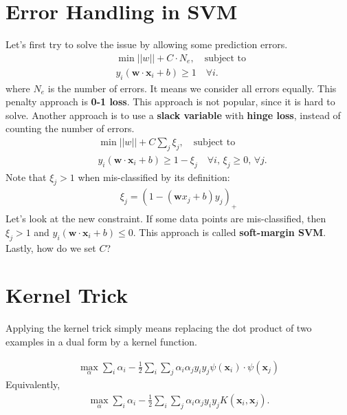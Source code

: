\section{Error Handling in SVM}
Let's first try to solve the issue by allowing some prediction errors. 
\begin{align*}
	&\min ||w||+C\cdot N_{e},\quad \textrm{subject to } \\
	&y_i(\mathbf{w}\cdot \mathbf{x}_i+b)\geq 1 \quad \forall i.
\end{align*}
where $N_e$ is the number of errors. It means we consider all errors equally. This penalty approach is \textbf{0-1 loss}. This approach is not popular, since it is hard to solve. Another approach is to use a \textbf{slack variable} with \textbf{hinge loss}, instead of counting the number of errors. 
\begin{align*}
	&\min ||w||+C\sum_j\xi_j ,\quad \textrm{subject to } \\
	&y_i(\mathbf{w}\cdot \mathbf{x}_i+b)\geq 1-\xi_j \quad \forall i,\, \xi_j\geq 0,\, \forall j.
\end{align*}
Note that $\xi_j>1$ when mis-classified by its definition: 
\begin{align*}
	\xi_j = (1-(\mathbf{w}x_j+b)y_j)_+
\end{align*}
Let's look at the new constraint. If some data points are mis-classified, then $\xi_j>1$ and $y_i(\mathbf{w}\cdot \mathbf{x}_i+b)\leq 0$. This approach is called \textbf{soft-margin SVM}. Lastly, how do we set $C$?

\section{Kernel Trick}
\label{sec:kernel_trick}
Applying the kernel trick simply means replacing the dot product of two examples in a dual form by a kernel function. 

\begin{align}
	 \max_\alpha \sum_i \alpha_i -\frac{1}{2}\sum_i\sum_j \alpha_i\alpha_j y_iy_j \psi(\mathbf{x}_i)\cdot \psi(\mathbf{x}_j)
	 \label{eq:kernel_dual_form}
\end{align}
Equivalently, 
\begin{align}
	 \max_\alpha \sum_i \alpha_i -\frac{1}{2}\sum_i\sum_j \alpha_i\alpha_j y_iy_j K(\mathbf{x}_i,\mathbf{x}_j).
\end{align}












